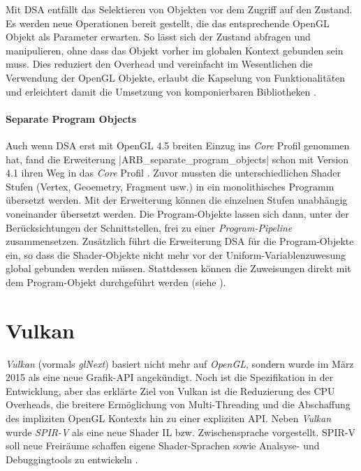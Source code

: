 Mit \ac{DSA} entfällt das Selektieren von Objekten vor dem Zugriff auf den Zustand. Es werden neue Operationen bereit gestellt, die das entsprechende OpenGL Objekt als Parameter erwarten. So lässt sich der Zustand abfragen und manipulieren, ohne dass das Objekt vorher im globalen Kontext gebunden sein muss. Dies reduziert den Overhead und vereinfacht im Wesentlichen die Verwendung der OpenGL Objekte, erlaubt die Kapselung von Funktionalitäten und erleichtert damit die Umsetzung von komponierbaren Bibliotheken .

\paragraph{Separate Program Objects} Auch wenn \ac{DSA} erst mit OpenGL 4.5 breiten Einzug ins \textit{Core} Profil genommen hat, fand die Erweiterung |ARB_separate_program_objects| schon mit Version 4.1 ihren Weg in das \textit{Core} Profil \parencite{Akeley2010}. Zuvor mussten die unterschiedlichen Shader Stufen (Vertex, Geoemetry, Fragment usw.) in ein monolithisches Programm übersetzt werden. Mit der Erweiterung können die einzelnen Stufen unabhängig voneinander übersetzt werden. Die Program-Objekte lassen sich dann, unter der Berücksichtungen der Schnittstellen, frei zu einer \textit{Program-Pipeline} zusammensetzen. Zusätzlich führt die Erweiterung \ac{DSA} für die Program-Objekte ein, so dass die Shader-Objekte nicht mehr vor der Uniform-Variablenzuwesung global gebunden werden müssen. Stattdessen können die Zuweisungen direkt mit dem Program-Objekt durchgeführt werden (siehe ).


\section{Vulkan}\label{sec:vulkan}

\textit{Vulkan} (vormals \textit{glNext}) basiert nicht mehr auf \textit{OpenGL}, sondern wurde im März 2015 als eine neue Grafik-API angekündigt. Noch ist die Spezifikation in der Entwicklung, aber das erklärte Ziel von Vulkan ist die Reduzierung des CPU Overheads, die breitere Ermöglichung von Multi-Threading und die Abschaffung des impliziten OpenGL Kontexts hin zu einer expliziten API. Neben \textit{Vulkan} wurde \textit{SPIR-V} als eine neue Shader \ac{IL} bzw. Zwischensprache vorgestellt. SPIR-V soll neue Freiräume schaffen eigene Shader-Sprachen sowie Analsyse- und Debuggingtools zu entwickeln \parencite{Olson2015}.

